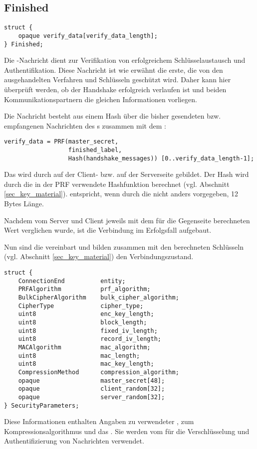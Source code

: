 \subsection{Finished}

\begin{lstlisting}
struct {
	opaque verify_data[verify_data_length];
} Finished;
\end{lstlisting}

Die \finished{}-Nachricht dient zur Verifikation von erfolgreichem Schlüsselaustausch und Authentifikation. Diese Nachricht ist wie erwähnt die erste, die von den ausgehandelten Verfahren und Schlüsseln geschützt wird. Daher kann hier überprüft werden, ob der Handshake erfolgreich verlaufen ist und beiden Kommunikationspartnern die gleichen Informationen vorliegen.

Die Nachricht besteht aus einem Hash über die bisher gesendeten bzw. empfangenen Nachrichten des \handshakeprotocol{}s zusammen mit dem \mastersecret{}:

\begin{lstlisting}
verify_data = PRF(master_secret, 
				  finished_label, 
				  Hash(handshake_messages)) [0..verify_data_length-1];
\end{lstlisting}

Das  wird durch  auf der Client- bzw.  auf der Serverseite gebildet. Der Hash wird durch die in der PRF verwendete Hashfunktion berechnet (vgl. Abschnitt \ref{sec_key_material}).   entspricht, wenn durch die \ciphersuite{} nicht anders vorgegeben, 12 Bytes Länge.

Nachdem  vom Server und Client jeweils mit dem für die Gegenseite berechneten Wert verglichen wurde, ist die Verbindung im Erfolgsfall aufgebaut. 

Nun sind die  vereinbart und bilden zusammen mit den berechneten Schlüsseln (vgl. Abschnitt \ref{sec_key_material}) den Verbindungszustand. 
\begin{lstlisting}
struct {
	ConnectionEnd          entity;
	PRFAlgorithm           prf_algorithm;
	BulkCipherAlgorithm    bulk_cipher_algorithm;
	CipherType             cipher_type;
	uint8                  enc_key_length;
	uint8                  block_length;
	uint8                  fixed_iv_length;
	uint8                  record_iv_length;
	MACAlgorithm           mac_algorithm;
	uint8                  mac_length;
	uint8                  mac_key_length;
	CompressionMethod      compression_algorithm;
	opaque                 master_secret[48];
	opaque                 client_random[32];
	opaque                 server_random[32];
} SecurityParameters;
\end{lstlisting}
Diese Informationen enthalten Angaben zu verwendeter \ciphersuite{}, zum Kompressionsalgorithmus und das \mastersecret{}. Sie werden vom \recordprotocol{} für die Verschlüsselung und Authentifizierung von Nachrichten verwendet.

